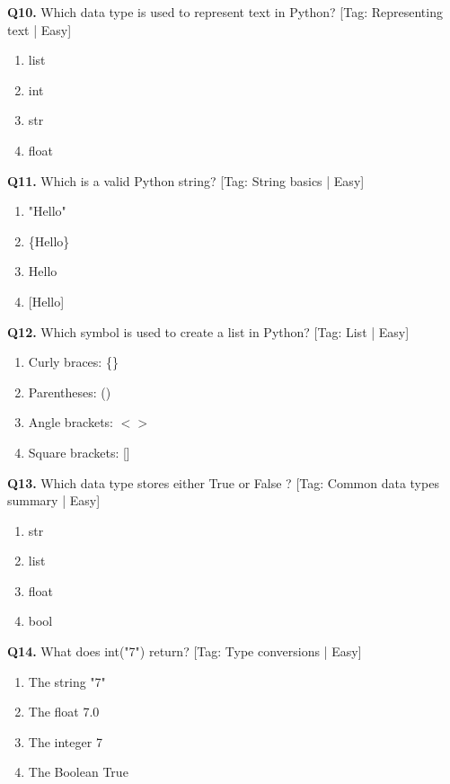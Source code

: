 \vspace{2mm}
\noindent\textbf{Q10.} Which data type is used to represent text in Python? \hfill [Tag: Representing text | Easy]
\begin{enumerate}[label=(\alph*),topsep=2pt,itemsep=1pt,partopsep=0pt,parsep=0pt]
    \item {list}
    \item {int}
    \item {str}
    \item {float}
\end{enumerate}
\vspace{2mm}
\noindent\textbf{Q11.} Which is a valid Python string? \hfill [Tag: String basics | Easy]
\begin{enumerate}[label=(\alph*),topsep=2pt,itemsep=1pt,partopsep=0pt,parsep=0pt]
    \item {"Hello"}
    \item {\{Hello\}}
    \item {Hello}
    \item {[Hello]}
\end{enumerate}
\vspace{2mm}
\noindent\textbf{Q12.} Which symbol is used to create a list in Python? \hfill [Tag: List | Easy]
\begin{enumerate}[label=(\alph*),topsep=2pt,itemsep=1pt,partopsep=0pt,parsep=0pt]
    \item {Curly braces: \{\}}
    \item {Parentheses: ()}
    \item {Angle brackets: $<$$>$}
    \item {Square brackets: []}
\end{enumerate}
\vspace{2mm}
\noindent\textbf{Q13.} Which data type stores either True or False ? \hfill [Tag: Common data types summary | Easy]
\begin{enumerate}[label=(\alph*),topsep=2pt,itemsep=1pt,partopsep=0pt,parsep=0pt]
    \item {str}
    \item {list}
    \item {float}
    \item {bool}
\end{enumerate}
\vspace{2mm}
\noindent\textbf{Q14.} What does int("7") return? \hfill [Tag: Type conversions | Easy]
\begin{enumerate}[label=(\alph*),topsep=2pt,itemsep=1pt,partopsep=0pt,parsep=0pt]
    \item {The string "7"}
    \item {The float 7.0}
    \item {The integer 7}
    \item {The Boolean True}
\end{enumerate}
